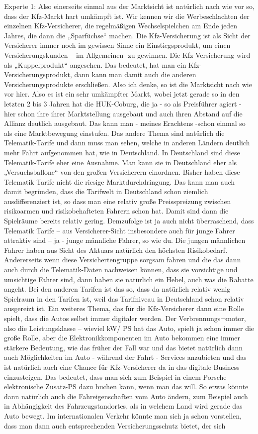 Experte 1:
Also einerseits einmal aus der Marktsicht ist natürlich nach wie vor so, dass der Kfz-Markt hart umkämpft ist. Wir kennen wir die Werbeschlachten der einzelnen Kfz-Versicherer, die regelmäßigen Wechselspielchen am Ende jeden Jahres, die dann die „Sparfüchse“ machen. Die Kfz-Versicherung ist als Sicht der Versicherer immer noch im gewissen Sinne ein Einstiegsprodukt, um einen Versicherungskunden – im Allgemeinen -zu gewinnen. Die Kfz-Versicherung wird als „Kuppelprodukt“ angesehen. Das bedeutet, hat man ein Kfz-Versicherungsprodukt, dann kann man damit auch die anderen Versicherungsprodukte erschließen. Also ich denke, so ist die Marktsicht nach wie vor hier. Also es ist ein sehr umkämpfter Markt, wobei jetzt gerade so in den letzten 2 bis 3 Jahren hat die HUK-Coburg, die ja - so als Preisführer agiert - hier schon ihre ihrer Marktstellung ausgebaut und auch ihren Abstand auf die Allianz deutlich ausgebaut. Das kann man - meines Erachtens -schon einmal so als eine Marktbewegung einstufen. Das andere Thema sind natürlich die Telematik-Tarife und dann muss man sehen, welche in anderen Ländern deutlich mehr Fahrt aufgenommen hat, wie in Deutschland. In Deutschland sind diese Telematik-Tarife eher eine Ausnahme. Man kann sie in Deutschland eher als „Versuchsballone“ von den großen Versicherern einordnen. Bisher haben diese Telematik Tarife nicht die riesige Marktdurchdringung. Das kann man auch damit begründen, dass die Tarifwelt in Deutschland schon ziemlich ausdifferenziert ist, so dass man eine relativ große Preisspreizung zwischen risikoarmen und risikobehafteten Fahrern schon hat. Damit sind dann die Spielräume bereits relativ gering. Demzufolge ist ja auch nicht überraschend, dass Telematik Tarife – aus Versicherer-Sicht insbesondere auch für junge Fahrer attraktiv sind – ja - junge männliche Fahrer, so wie du. Die jungen männlichen Fahrer haben aus Sicht des Aktuars natürlich den höchsten Risikobedarf. Andererseits wenn diese Versichertengruppe sorgsam fahren und die das dann auch durch die Telematik-Daten nachweisen können, dass sie vorsichtige und umsichtige Fahrer sind, dann haben sie natürlich ein Hebel, auch was die Rabatte angeht. Bei den anderen Tarifen ist das so, dass da natürlich relativ wenig Spielraum in den Tarifen ist, weil das Tarifniveau in Deutschland schon relativ ausgereizt ist. Ein weiteres Thema, das für die Kfz-Versicherer dann eine Rolle spielt, dass die Autos selbst immer digitaler werden.  Der Verbrennungs¬motor, also die Leistungsklasse – wieviel kW/ PS hat das Auto, spielt ja schon immer die große Rolle, aber die Elektronikkomponenten im Auto bekommen eine immer stärkere Bedeutung, wie das früher der Fall war und das bietet natürlich dann auch Möglichkeiten im Auto - während der Fahrt - Services anzubieten und das ist natürlich auch eine Chance für Kfz-Versicherer da in das digitale Business einzusteigen. Das bedeutet, dass man sich zum Beispiel in einem Porsche elektronische Zusatz-PS dazu buchen kann, wenn man das will. So etwas könnte dann natürlich auch die Fahreigenschaften vom Auto ändern, zum Beispiel auch in Abhängigkeit des Fahrzeugstandortes, als in welchem Land wird gerade das Auto bewegt. Im internationalen Verkehr könnte man sich ja schon vorstellen, dass man dann auch entsprechenden Versicherungsschutz bietet, der sich 